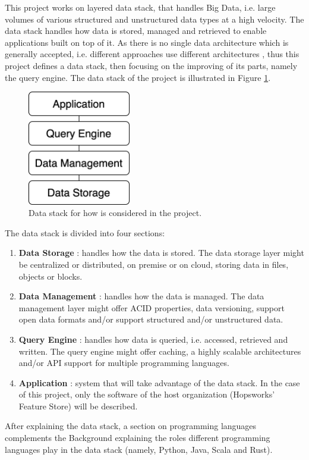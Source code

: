 This project works on layered data stack, that handles Big Data, i.e. large volumes of various structured and unstructured data types at a high velocity. The data stack handles how data is stored, managed and retrieved to enable applications built on top of it. 
As there is no single data architecture which is generally accepted, i.e. different approaches use different architectures \cite{framptonCompleteGuideOpen2018,sakrBigDataProcessing2017}, thus this project defines a data stack, then focusing on the improving of its parts, namely the query engine. The data stack of the project is illustrated in Figure \ref{fig:data_stack}.

\begin{figure}[!ht]
    \begin{center}
      \includegraphics[width=0.4\textwidth]{figures/2-background/data_stack.png}
    \end{center}
    \caption{Data stack for how is considered in the project.}
    \label{fig:data_stack}
\end{figure}

The data stack is divided into four sections:
\begin{enumerate}
    \item \textbf{Data Storage} : handles how the data is stored. The data storage layer might be centralized or distributed, on premise or on cloud, storing data in files, objects or blocks.
    \item \textbf{Data Management} : handles how the data is managed. The data management layer might offer \gls{ACID} properties, data versioning, support open data formats and/or support structured and/or unstructured data.
    \item \textbf{Query Engine} : handles how data is queried, i.e. accessed, retrieved and written. The query engine might offer caching, a highly scalable architectures and/or \gls{API} support for multiple programming languages.
    \item \textbf{Application} : system that will take advantage of the data stack. In the case of this project, only the software of the host organization (Hopsworks' Feature Store) will be described. 
\end{enumerate}

After explaining the data stack, a section on programming languages complements the Background explaining the roles different programming languages play in the data stack (namely, Python, Java, Scala and Rust).
